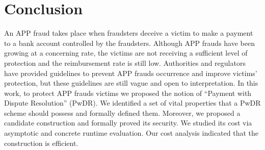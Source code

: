 

\section{Conclusion}\label{sec::conclusion}


An APP fraud takes place when fraudsters deceive a victim to make a payment to a bank account controlled by the fraudsters. Although APP frauds have been growing at a concerning rate, the  victims are not receiving a sufficient level of protection and the reimbursement rate is still low. Authorities and regulators have  provided guidelines  to prevent APP frauds occurrence and improve victims’ protection, but these guidelines are still vague and open to interpretation. In this work, to protect APP frauds victims  we proposed the notion of “Payment with Dispute Resolution” (PwDR). We identified a set of vital properties that a PwDR scheme should possess and formally defined them. Moreover,  we proposed a candidate construction and formally proved its security. We studied its cost via asymptotic and concrete runtime evaluation. Our cost analysis indicated that the construction is efficient. 





